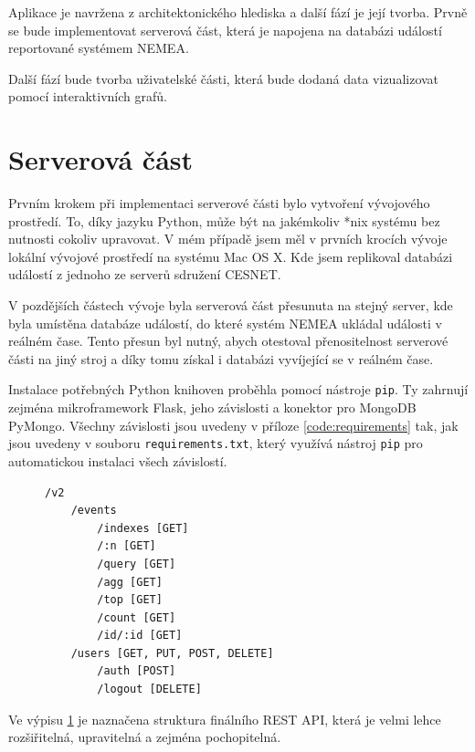 Aplikace je navržena z architektonického hlediska a další fází je její tvorba. Prvně se bude implementovat serverová část, která je napojena na databázi událostí reportované systémem NEMEA.

Další fází bude tvorba uživatelské části, která bude dodaná data vizualizovat pomocí interaktivních grafů.

\label{implementace}
\section{Serverová část}

Prvním krokem při implementaci serverové části bylo vytvoření vývojového prostředí. To, díky jazyku Python, může být na jakémkoliv *nix systému bez nutnosti cokoliv upravovat. V mém případě jsem měl v prvních krocích vývoje lokální vývojové prostředí na systému Mac OS X. Kde jsem replikoval databázi událostí z jednoho ze serverů sdružení CESNET.

V pozdějších částech vývoje byla serverová část přesunuta na stejný server, kde byla umístěna databáze událostí, do které systém NEMEA ukládal události v reálném čase. Tento přesun byl nutný, abych otestoval přenositelnost serverové části na jiný stroj a díky tomu získal i databázi vyvíjející se v reálném čase.

Instalace potřebných Python knihoven proběhla pomocí nástroje \texttt{pip}. Ty zahrnují zejména mikroframework Flask, jeho závislosti a konektor pro MongoDB PyMongo. Všechny závislosti jsou uvedeny v příloze \ref{code:requirements} tak, jak jsou uvedeny v souboru \texttt{requirements.txt}, který využívá nástroj \texttt{pip} pro automatickou instalaci všech závislostí.

\begin{figure}[ht]
\lstset{basicstyle=\small,style=JSON}
\begin{lstlisting}
/v2
    /events
        /indexes [GET]
        /:n [GET]
        /query [GET]
        /agg [GET]
        /top [GET]
        /count [GET]
        /id/:id [GET]
    /users [GET, PUT, POST, DELETE]
        /auth [POST]
        /logout [DELETE]
\end{lstlisting}
\label{code:api}
\end{figure}

Ve výpisu \ref{code:api} je naznačena struktura finálního REST API, která je velmi lehce rozšiřitelná, upravitelná a zejména pochopitelná.

